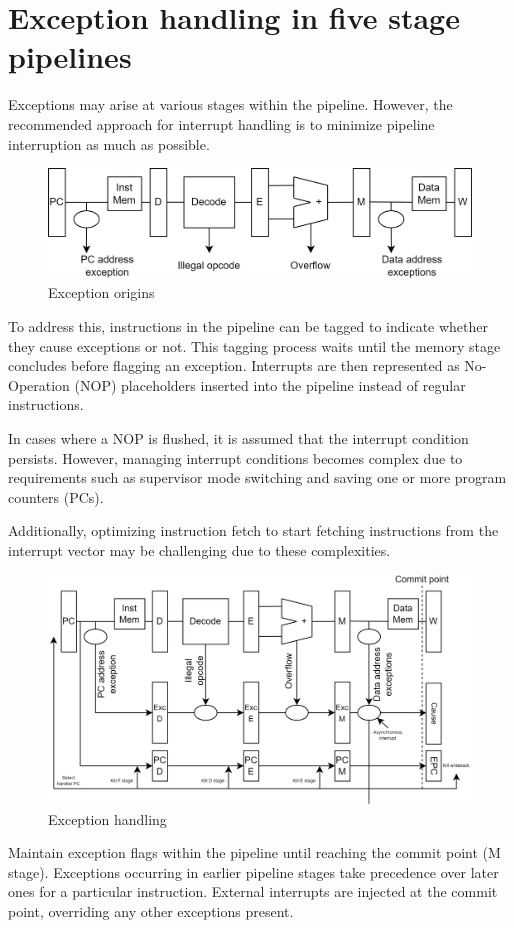 \section{Exception handling in five stage pipelines}

Exceptions may arise at various stages within the pipeline. 
However, the recommended approach for interrupt handling is to minimize pipeline interruption as much as possible.
\begin{figure}[H]
    \centering
    \includegraphics[width=0.75\linewidth]{images/5s.png}
    \caption{Exception origins}
\end{figure}
To address this, instructions in the pipeline can be tagged to indicate whether they cause exceptions or not. 
This tagging process waits until the memory stage concludes before flagging an exception. 
Interrupts are then represented as No-Operation (NOP) placeholders inserted into the pipeline instead of regular instructions.

In cases where a NOP is flushed, it is assumed that the interrupt condition persists.
However, managing interrupt conditions becomes complex due to requirements such as supervisor mode switching and saving one or more program counters (PCs).

Additionally, optimizing instruction fetch to start fetching instructions from the interrupt vector may be challenging due to these complexities.
\begin{figure}[H]
    \centering
    \includegraphics[width=0.75\linewidth]{images/5s2.png}
    \caption{Exception handling}
\end{figure}
Maintain exception flags within the pipeline until reaching the commit point (M stage). 
Exceptions occurring in earlier pipeline stages take precedence over later ones for a particular instruction. 
External interrupts are injected at the commit point, overriding any other exceptions present.

